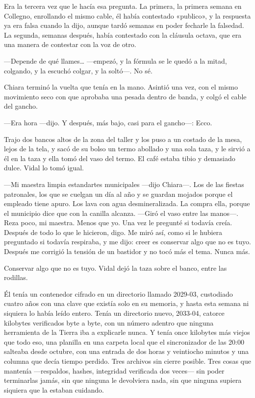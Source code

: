 Era la tercera vez que le hacía esa pregunta. La primera, la primera semana en Collegno, enrollando el mismo cable, él había contestado «publico», y la respuesta ya era falsa cuando la dijo, aunque tardó semanas en poder fecharle la falsedad. La segunda, semanas después, había contestado con la cláusula octava, que era una manera de contestar con la voz de otro.

---Depende de qué llames\ldots{} ---empezó, y la fórmula se le quedó a la mitad, colgando, y la escuchó colgar, y la soltó---. No sé.

Chiara terminó la vuelta que tenía en la mano. Asintió una vez, con el mismo movimiento seco con que aprobaba una pesada dentro de banda, y colgó el cable del gancho.

---Era hora ---dijo. Y después, más bajo, casi para el gancho---: Ecco.

Trajo dos bancos altos de la zona del taller y los puso a un costado de la mesa, lejos de la tela, y sacó de su bolso un termo abollado y una sola taza, y le sirvió a él en la taza y ella tomó del vaso del termo. El café estaba tibio y demasiado dulce. Vidal lo tomó igual.

---Mi maestra limpia estandartes municipales ---dijo Chiara---. Los de las fiestas patronales, los que se cuelgan un día al año y se guardan mojados porque el empleado tiene apuro. Los lava con agua desmineralizada. La compra ella, porque el municipio dice que con la canilla alcanza. ---Giró el vaso entre las manos---. Reza poco, mi maestra. Menos que yo. Una vez le pregunté si todavía creía. Después de todo lo que le hicieron, digo. Me miró así, como si le hubiera preguntado si todavía respiraba, y me dijo: creer es conservar algo que no es tuyo. Después me corrigió la tensión de un bastidor y no tocó más el tema. Nunca más.

Conservar algo que no es tuyo. Vidal dejó la taza sobre el banco, entre las rodillas.

Él tenía un contenedor cifrado en un directorio llamado 2029-03, custodiado cuatro años con una clave que existía solo en su memoria, y hasta esta semana ni siquiera lo había leído entero. Tenía un directorio nuevo, 2033-04, catorce kilobytes verificados byte a byte, con un número adentro que ninguna herramienta de la Tierra iba a explicarle nunca. Y tenía once kilobytes más viejos que todo eso, una planilla en una carpeta local que el sincronizador de las 20:00 salteaba desde octubre, con una entrada de dos horas y veintiocho minutos y una columna que decía tiempo perdido. Tres archivos sin cierre posible. Tres cosas que mantenía ---respaldos, hashes, integridad verificada dos veces--- sin poder terminarlas jamás, sin que ninguna le devolviera nada, sin que ninguna supiera siquiera que la estaban cuidando.

